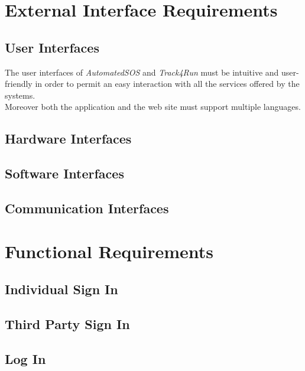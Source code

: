 \section{External Interface Requirements}

\subsection{User Interfaces}
The user interfaces of \textit{AutomatedSOS} and \textit{Track4Run} must be intuitive and user-friendly in order to permit an easy interaction with all the services offered by the systems.\\
Moreover both the application and the web site must support multiple languages.

\subsection{Hardware Interfaces}

\subsection{Software Interfaces}

\subsection{Communication Interfaces}

\clearpage
\section{Functional Requirements}

\subsection{Individual Sign In}

\clearpage

\subsection{Third Party Sign In}

\clearpage

\subsection{Log In}

\clearpage

